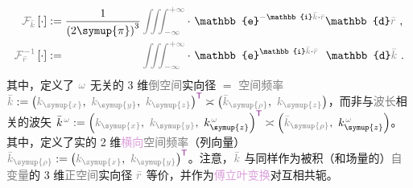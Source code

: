 \begin{subequations} \label{eq:FT-rk}
	\abovedisplayskip=10pt
	\belowdisplayskip=12pt
\begin{align}
	\mathcolor{gray}{\mathcal F_{\bar{k}}} \left[ \cdot \right] &:= \frac{ 1 }{ \left( 2\symup{\pi} \right)^3 } \mathcolor{gray}{\iiint_{-\infty}^{+\infty}} \cdot~ \mathbb{e}^{-\mathbb{i}\mathcolor{gray}{\bar{k}} \cdot \mathcolor{gray}{\bar{r}}} \mathbb{d}\mathcolor{gray}{\bar{r}} ~, \label{eq:FT-k} \\
	\mathcolor{gray}{\mathcal F_{\bar{r}}^{-1}} \left[ \cdot \right] &:= \hphantom{\frac{ 1 }{ \left( 2\symup{\pi} \right)^3 }} \mathcolor{gray}{\iiint_{-\infty}^{+\infty}} \cdot~ \mathbb{e}^{\mathbb{i}\mathcolor{gray}{\bar{k}} \cdot \mathcolor{gray}{\bar{r}}} \hphantom{^-} \mathbb{d}\mathcolor{gray}{\bar{k}} ~. \label{eq:IFT-r}
\end{align}
\end{subequations}
其中，定义了 $\mathcolor{gray}{\omega}$ 无关的 3 维\textcolor{gray}{倒空间}实向径 $=$ \textcolor{gray}{空间频率} $\mathcolor{gray}{\bar{k}} := \left( \mathcolor{gray}{k_{\symup{x}}},~ \mathcolor{gray}{k_{\symup{y}}},~ \mathcolor{gray}{k_{\symup{z}}} \right)^{\mathsf{\textcolor{Plum}{T}}} \asymp \left( \mathcolor{gray}{\bar{k}_{\symup{\rho}}},~ \mathcolor{gray}{k_{\symup{z}}} \right)$，而非与\textcolor{gray}{波长}相关的\textcolor{PineGreen}{波矢} $\bar{k}^{\;\! \mathcolor{gray}{\omega}} := \left( \mathcolor{gray}{k_{\symup{x}}},~ \mathcolor{gray}{k_{\symup{y}}},~ k_{\symup{z}}^{\;\! \mathcolor{gray}{\omega}} \right)^{\mathsf{\textcolor{Plum}{T}}} \asymp \left( \mathcolor{gray}{\bar{k}_{\symup{\rho}}},~ k_{\symup{z}}^{\;\! \mathcolor{gray}{\omega}} \right)$。其中，定义了实的 2 维\textcolor{Plum}{横向}\textcolor{gray}{空间频率}（列向量） $\mathcolor{gray}{\bar{k}_{\symup{\rho}}} := \left( \mathcolor{gray}{k_{\symup{x}}},~ \mathcolor{gray}{k_{\symup{y}}} \right)^{\mathsf{\textcolor{Plum}{T}}}$。注意，$\mathcolor{gray}{\bar{k}}$ 与同样作为被积（和场量的）\textcolor{gray}{自变量}的 3 维\textcolor{gray}{正空间}实向径 $\mathcolor{gray}{\bar{r}}$ 等价，并作为\textcolor{Plum}{傅立叶变换}对互相共轭。

